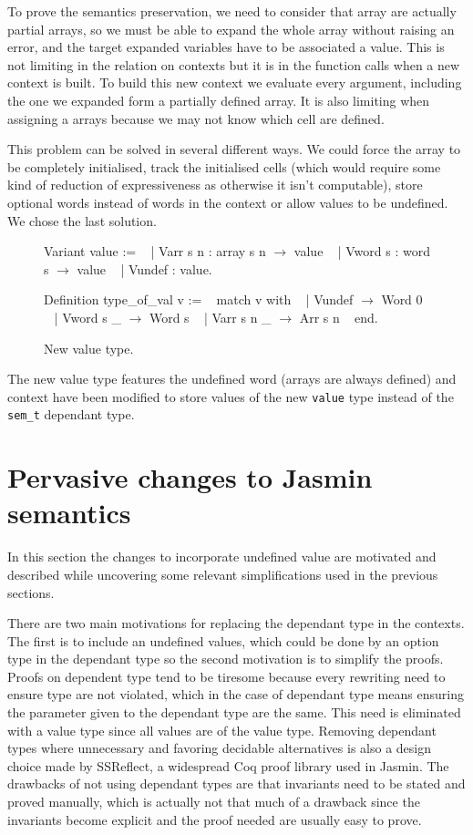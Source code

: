 \documentclass{article}
\begin{document}
\medskip

To prove the semantics preservation, we need to consider that array are actually
partial arrays, so we must be able to expand the whole array without raising an
error, and the target expanded variables have to be associated a value. This is
not limiting in the relation on contexts but it is in the function calls when a
new context is built. To build this new context we evaluate every argument,
including the one we expanded form a partially defined array. It is also
limiting when assigning a arrays because we may not know which cell are defined.

This problem can be solved in several different ways. We could force the array
to be completely initialised, track the initialised cells (which would require
some kind of reduction of expressiveness as otherwise it isn't computable),
store optional words instead of words in the context or allow values to be
undefined. We chose the last solution.

\smallskip

\begin{figure}[t]
\obeylines\obeyspaces\ttfamily%
Variant value :=
~ | Varr s n : array s n \(\rightarrow\) value
~ | Vword s  : word  s   \(\rightarrow\) value
~ | Vundef   :              value.

Definition type\_of\_val v :=
~ match v with
~ | Vundef     \(\rightarrow\) Word 0
~ | Vword s  \_ \(\rightarrow\) Word s
~ | Varr s n \_ \(\rightarrow\) Arr s n
~ end.
\normalfont%
\caption{New value type.}
\end{figure}

The new value type features the undefined word (arrays are always defined) and
context have been modified to store values of the new \texttt{value} type
instead of the \texttt{sem\_t} dependant type.


\section{Pervasive changes to Jasmin semantics}\label{sec:perch}

In this section the changes to incorporate undefined value are motivated and
described while uncovering some relevant simplifications used in the previous
sections.

There are two main motivations for replacing the dependant type in the contexts.
The first is to include an undefined values, which could be done by an option
type in the dependant type so the second motivation is to simplify the proofs.
Proofs on dependent type tend to be tiresome because every rewriting need to
ensure type are not violated, which in the case of dependant type means ensuring
the parameter given to the dependant type are the same. This need is eliminated
with a value type since all values are of the value type. Removing dependant
types where unnecessary and favoring decidable alternatives is also a design
choice made by SSReflect, a widespread Coq proof library used in Jasmin. The
drawbacks of not using dependant types are that invariants need to be stated and
proved manually, which is actually not that much of a drawback since the
invariants become explicit and the proof needed are usually easy to prove.
\end{document}

